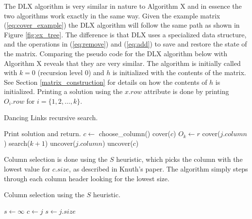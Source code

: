 The DLX algorithm is very similar in nature to Algorithm X and in essence the two algorithms work exactly in the same way.
Given the example matrix (\ref{eq:cover_example}) the DLX algorithm will follow the same path as shown in Figure \ref{fig:ex_tree}.
The difference is that DLX uses a specialized data structure, and the operations in (\ref{eq:remove}) and (\ref{eq:add}) to save and restore the state of the matrix.
Comparing the pseudo code for the DLX algorithm below with Algorithm X reveals that they are very similar.
The algorithm is initially called with $k = 0$ (recursion level 0) and $h$ is initialized with the contents of the matrix.
See Section \ref{matrix_construction} for details on how the contents of $h$ is initialized.
Printing a solution using the $x.row$ attribute is done by printing $O_{i}.row$ for $i = \{1, 2, \ldots, k\}$.
\begin{algorithm}[H]
	\caption{Dancing Links recursive search.}
	\label{dlx_search}
	\begin{distribalgo}[1]
				\STATE Print solution and return.  
			\ENDIF
			\STATE $c \leftarrow$ choose\_column()
			\STATE cover($c$)
				\STATE $O_k \leftarrow r$  
					\STATE cover($j.column$)
				\ENDFOR
				\STATE search($k + 1$)
					\STATE uncover($j.column$)
				\ENDFOR
			\ENDFOR
			\STATE uncover($c$)
		\ENDPROC
	\end{distribalgo}
\end{algorithm}

Column selection is done using the $S$ heuristic, which picks the column with the lowest value for $c.size$, as described in Knuth's paper.
The algorithm simply steps through each column header looking for the lowest size.
\begin{algorithm}[H]
	\caption{Column selection using the $S$ heuristic.}
	\label{dlx_column}
	\begin{distribalgo}[1]
			\STATE $s \leftarrow \infty$
					\STATE $c \leftarrow j$
					\STATE $s \leftarrow j.size$
				\ENDIF
			\ENDFOR
		\ENDFUNC
	\end{distribalgo}
\end{algorithm}

